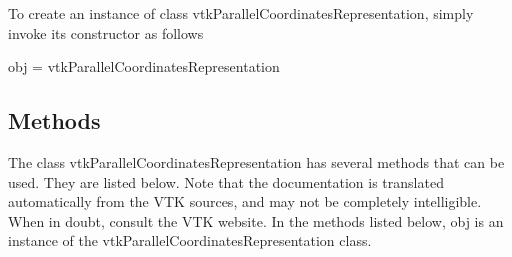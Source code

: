 To create an instance of class vtk\-Parallel\-Coordinates\-Representation, simply invoke its constructor as follows \begin{DoxyVerb}  obj = vtkParallelCoordinatesRepresentation
\end{DoxyVerb}
 \hypertarget{vtkwidgets_vtkxyplotwidget_Methods}{}\subsection{Methods}\label{vtkwidgets_vtkxyplotwidget_Methods}
The class vtk\-Parallel\-Coordinates\-Representation has several methods that can be used. They are listed below. Note that the documentation is translated automatically from the V\-T\-K sources, and may not be completely intelligible. When in doubt, consult the V\-T\-K website. In the methods listed below, {\ttfamily obj} is an instance of the vtk\-Parallel\-Coordinates\-Representation class. 
